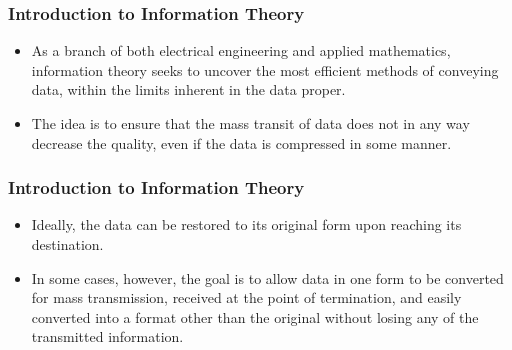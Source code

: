 \documentclass[a4]{beamer}
\begin{document}
\begin{frame}
\frametitle{Introduction to Information Theory}
\begin{itemize}

\item As a branch of both electrical engineering and applied mathematics, information theory seeks to uncover the most efficient 
methods of conveying data, within the limits inherent in the data proper. \item The idea is to ensure that the mass transit of data does 
not in any way decrease the quality, even if the data is compressed in some manner. 
\end{itemize}
\end{frame}
\begin{frame}
\frametitle{Introduction to Information Theory}
\begin{itemize}
\item Ideally, the data can be restored to its original form upon reaching its destination. 
\item In some cases, however, the goal is to allow data in one form to be converted for mass transmission, 
received at the point of termination, and easily converted into a format other than the original without losing any of the transmitted information.
\end{itemize}
\end{frame}

\end{document}
